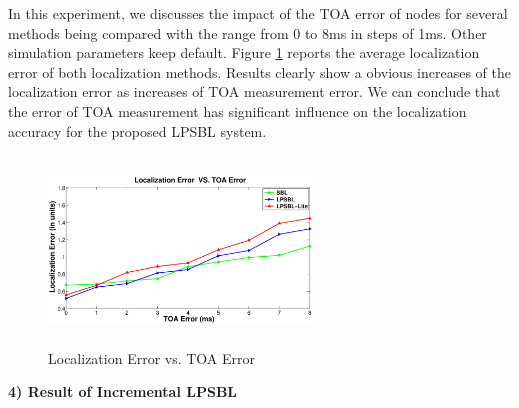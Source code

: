 In this experiment, we discusses the impact of the TOA error of nodes for several methods being compared with the range from 0 to 8ms in steps of 1ms. 
Other simulation parameters keep default. 
Figure \ref{fig6} reports the average localization error of both localization methods. 
Results clearly show a obvious increases of the localization error as increases of TOA measurement error.
We can conclude that the error of TOA measurement has significant influence on the localization accuracy for the proposed LPSBL system. 
	 \begin{figure}[htb]       
            \centering
			\vspace{-2mm}
            \includegraphics[height=5.0cm,width=7.0cm]{image/TOA.eps}
                \caption{Localization Error vs. TOA Error}
             \vspace{-3mm}
             \label{fig6}
        \end{figure}

 \textbf{4) Result of Incremental LPSBL} 
 
